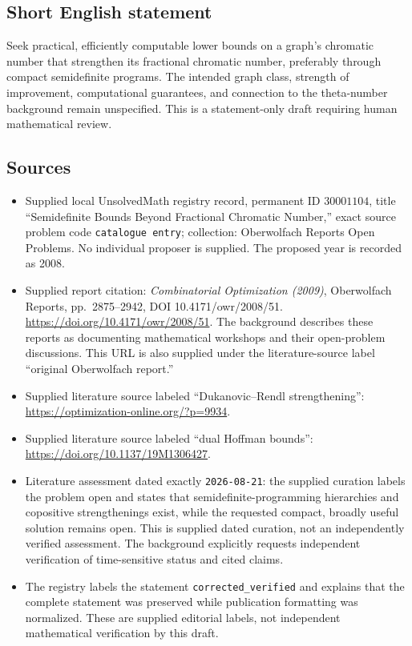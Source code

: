 \documentclass[11pt]{article}
\begin{document}
\subsection{Short English statement}
Seek practical, efficiently computable lower bounds on a graph's chromatic number that strengthen its fractional chromatic number, preferably through compact semidefinite programs. The intended graph class, strength of improvement, computational guarantees, and connection to the theta-number background remain unspecified. This is a statement-only draft requiring human mathematical review.
\subsection{Sources}
\begin{itemize}
\item Supplied local UnsolvedMath registry record, permanent ID \(30001104\), title ``Semidefinite Bounds Beyond Fractional Chromatic Number,'' exact source problem code \texttt{catalogue entry}; collection: Oberwolfach Reports Open Problems. No individual proposer is supplied. The proposed year is recorded as 2008.
\item Supplied report citation: \emph{Combinatorial Optimization (2009)}, Oberwolfach Reports, pp.\ 2875--2942, DOI 10.4171/owr/2008/51. \url{https://doi.org/10.4171/owr/2008/51}. The background describes these reports as documenting mathematical workshops and their open-problem discussions. This URL is also supplied under the literature-source label ``original Oberwolfach report.''
\item Supplied literature source labeled ``Dukanovic--Rendl strengthening'': \url{https://optimization-online.org/?p=9934}.
\item Supplied literature source labeled ``dual Hoffman bounds'': \url{https://doi.org/10.1137/19M1306427}.
\item Literature assessment dated exactly \texttt{2026-08-21}: the supplied curation labels the problem open and states that semidefinite-programming hierarchies and copositive strengthenings exist, while the requested compact, broadly useful solution remains open. This is supplied dated curation, not an independently verified assessment. The background explicitly requests independent verification of time-sensitive status and cited claims.
\item The registry labels the statement \texttt{corrected\_verified} and explains that the complete statement was preserved while publication formatting was normalized. These are supplied editorial labels, not independent mathematical verification by this draft.
\end{itemize}
\end{document}

